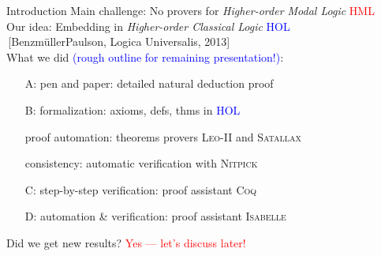 \begin{frame}{Introduction} \large
Main challenge: \hfill No provers for \emph{Higher-order Modal Logic} \textcolor{red}{HML} \\[1em]

Our idea: \hfill Embedding in \emph{Higher-order Classical Logic} \textcolor{blue}{HOL} \\
\,\hfill {\small [Benzm\"ullerPaulson, Logica Universalis, 2013]} \\[2em]

What we did \textcolor{blue}{(rough outline for remaining
  presentation!)}: \\

\begin{itemize}
\item[A:] pen and paper: detailed natural deduction proof 
\item[B:] formalization: axioms, defs, thms  in \textcolor{blue}{HOL}
\item[] proof automation: theorems provers \textsc{Leo-II} and \textsc{Satallax} 
\item[] consistency: automatic verification with \textsc{Nitpick} 
\item[C:] step-by-step verification: proof assistant \textsc{Coq} 
\item[D:] automation \& verification: proof assistant 
  \textsc{Isabelle} \\[2em]
\end{itemize}
Did we get new results? \hfill  \textcolor{red}{Yes --- let's discuss later!}
\end{frame}
